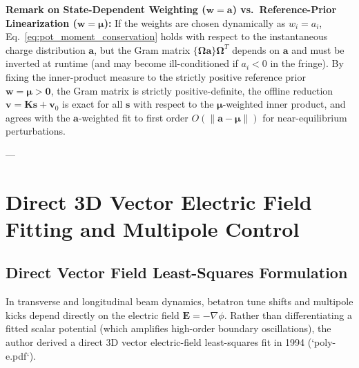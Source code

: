 \documentclass[11pt,a4paper]{article}
\newcommand{\bOmega}{\mathbf{\Omega}}
\begin{document}
\noindent\textbf{Remark on State-Dependent Weighting ($\bm{w}=\bm{a}$) vs.\ Reference-Prior Linearization ($\bm{w}=\bm{\mu}$):}
If the weights are chosen dynamically as $w_i = a_i$, Eq.~\eqref{eq:pot_moment_conservation} holds with respect to the instantaneous charge distribution $\bm{a}$, but the Gram matrix $\{\bOmega\bm{a}\}\bOmega^T$ depends on $\bm{a}$ and must be inverted at runtime (and may become ill-conditioned if $a_i < 0$ in the fringe). By fixing the inner-product measure to the strictly positive reference prior $\bm{w} = \bm{\mu} > \bm{0}$, the Gram matrix is strictly positive-definite, the offline reduction $\bm{v} = \bm{K}\bm{s} + \bm{v}_0$ is exact for all $\bm{s}$ with respect to the $\bm{\mu}$-weighted inner product, and agrees with the $\bm{a}$-weighted fit to first order $O(\|\bm{a} - \bm{\mu}\|)$ for near-equilibrium perturbations.

---

\section{Direct 3D Vector Electric Field Fitting and Multipole Control}

\subsection{Direct Vector Field Least-Squares Formulation}
In transverse and longitudinal beam dynamics, betatron tune shifts and multipole kicks depend directly on the electric field $\bm{E} = -\nabla \phi$. Rather than differentiating a fitted scalar potential (which amplifies high-order boundary oscillations), the author derived a direct 3D vector electric-field least-squares fit in 1994 (`poly-e.pdf`).
\end{document}
